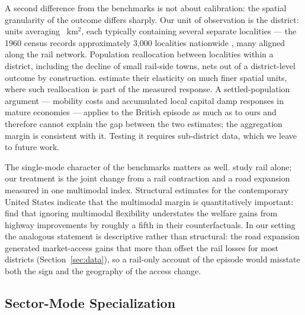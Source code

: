 A second difference from the benchmarks is not about calibration:
the spatial granularity of the outcome differs sharply. Our
unit of observation is the district: \nDistricts{} units averaging
\meanDistrictArea~km$^2$, each typically containing several separate
localities --- the 1960 census records approximately 3{,}000
localities nationwide \citep{censo1960pop}, many aligned along the
rail network.
Population reallocation between localities within a district,
including the decline of small rail-side towns, nets out of a
district-level outcome by construction. \citet{gibbons2024} estimate
their elasticity on much finer spatial units, where such
reallocation is part of the measured response. A settled-population
argument --- mobility costs and accumulated local capital damp
responses in mature economies --- applies to the British episode as
much as to ours and therefore cannot explain the gap between the
two estimates; the aggregation margin is consistent with it. Testing
it requires sub-district data, which we leave to future work.

The single-mode character of the benchmarks matters as well.
\citet{gibbons2024} study rail alone; our treatment is the joint
change from a rail contraction and a road expansion measured in one
multimodal index. Structural estimates for the contemporary United
States indicate that the multimodal margin is quantitatively
important: \citet{fuchswong2026} find that ignoring multimodal
flexibility understates the welfare gains from highway improvements
by roughly a fifth in their counterfactuals. In our setting the
analogous statement is descriptive rather than structural: the road
expansion generated market-access gains that more than offset the
rail losses for most districts (Section~\ref{sec:data}), so a
rail-only account of the episode would misstate both the sign and
the geography of the access change.

\subsection{Sector-Mode Specialization}
\label{sec:sector_mode}

